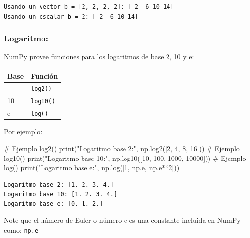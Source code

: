 \documentclass[
  letterpaper,
  DIV=11,
  numbers=noendperiod]{scrreprt}
\newenvironment{Shaded}{\begin{snugshade}}{\end{snugshade}}
\newcommand{\BuiltInTok}[1]{\textcolor[rgb]{0.00,0.23,0.31}{#1}}
\newcommand{\CommentTok}[1]{\textcolor[rgb]{0.37,0.37,0.37}{#1}}
\newcommand{\DecValTok}[1]{\textcolor[rgb]{0.68,0.00,0.00}{#1}}
\newcommand{\NormalTok}[1]{\textcolor[rgb]{0.00,0.23,0.31}{#1}}
\newcommand{\OperatorTok}[1]{\textcolor[rgb]{0.37,0.37,0.37}{#1}}
\newcommand{\StringTok}[1]{\textcolor[rgb]{0.13,0.47,0.30}{#1}}
\begin{document}
\begin{verbatim}
Usando un vector b = [2, 2, 2, 2]: [ 2  6 10 14]
Usando un escalar b = 2: [ 2  6 10 14]
\end{verbatim}

\subsubsection{Logaritmo:}\label{logaritmo}

NumPy provee funciones para los logaritmos de base 2, 10 y e:

\begin{longtable}[]{@{}ll@{}}
\toprule\noalign{}
Base & Función \\
\midrule\noalign{}
\endhead
\bottomrule\noalign{}
\endlastfoot
2 & \texttt{log2()} \\
10 & \texttt{log10()} \\
e & \texttt{log()} \\
\end{longtable}

Por ejemplo:

\begin{Shaded}
\begin{Highlighting}[]
\CommentTok{\# Ejemplo log2()}
\BuiltInTok{print}\NormalTok{(}\StringTok{"Logaritmo base 2:"}\NormalTok{, np.log2([}\DecValTok{2}\NormalTok{, }\DecValTok{4}\NormalTok{, }\DecValTok{8}\NormalTok{, }\DecValTok{16}\NormalTok{]))}
\CommentTok{\# Ejemplo log10()}
\BuiltInTok{print}\NormalTok{(}\StringTok{"Logaritmo base 10:"}\NormalTok{, np.log10([}\DecValTok{10}\NormalTok{, }\DecValTok{100}\NormalTok{, }\DecValTok{1000}\NormalTok{, }\DecValTok{10000}\NormalTok{]))}
\CommentTok{\# Ejemplo log()}
\BuiltInTok{print}\NormalTok{(}\StringTok{"Logaritmo base e:"}\NormalTok{, np.log([}\DecValTok{1}\NormalTok{, np.e, np.e}\OperatorTok{**}\DecValTok{2}\NormalTok{]))}
\end{Highlighting}
\end{Shaded}

\begin{verbatim}
Logaritmo base 2: [1. 2. 3. 4.]
Logaritmo base 10: [1. 2. 3. 4.]
Logaritmo base e: [0. 1. 2.]
\end{verbatim}

\begin{tcolorbox}[enhanced jigsaw, arc=.35mm, toptitle=1mm, colframe=quarto-callout-note-color-frame, bottomtitle=1mm, opacitybacktitle=0.6, colbacktitle=quarto-callout-note-color!10!white, leftrule=.75mm, coltitle=black, toprule=.15mm, titlerule=0mm, title=\textcolor{quarto-callout-note-color}{\faInfo}\hspace{0.5em}{Note}, bottomrule=.15mm, rightrule=.15mm, colback=white, breakable, opacityback=0, left=2mm]

Note que el número de Euler o número e es una constante incluida en
NumPy como: \texttt{np.e}

\end{tcolorbox}
\end{document}
